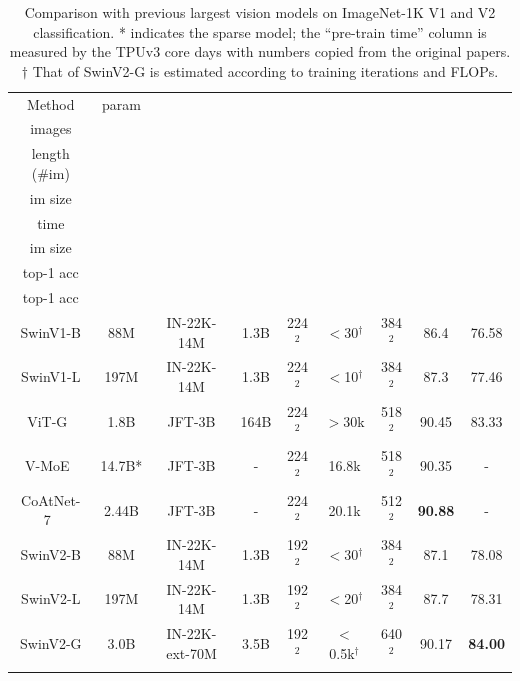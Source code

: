 \documentclass[10pt,twocolumn,letterpaper]{article}
\begin{document}
\begin{table}[t]
    \centering
    \small
    \addtolength{\tabcolsep}{-2.0pt}
    \begin{tabular}{ccccccccc}
    \Xhline{1.0pt}
    Method & param & \makecell{ pre-train\\images} & \makecell{ pre-train\\length (\#im)} & \makecell{pre-train\\im size} & \makecell{pre-train\\time} & \makecell{fine-tune\\im size} & \makecell{ImageNet-1K-V1\\top-1 acc} & \makecell{ImaegNet-1K-V2\\top-1 acc}\\
    \hline
    SwinV1-B & 88M & IN-22K-14M & 1.3B & 224$^2$ & $<$30$^\dag$ & 384$^2$ &86.4 &  76.58\\
    SwinV1-L & 197M & IN-22K-14M & 1.3B & 224$^2$ & $<$10$^\dag$ & 384$^2$ &  87.3 & 77.46\\
    \hline
    ViT-G~\cite{zhai2021scaling} & 1.8B & JFT-3B & 164B & 224$^2$ & $>$30k & 518$^2$ & 90.45 & 83.33 \\
    V-MoE~\cite{riquelme2021scaling} & 14.7B* & JFT-3B & - & 224$^2$ & 16.8k & 518$^2$ & 90.35 & - \\
    CoAtNet-7~\cite{dai2021coatnet} & 2.44B & JFT-3B & - & 224$^2$ & 20.1k & 512$^2$ & \textbf{90.88} & - \\
    \hline
    SwinV2-B & 88M & IN-22K-14M & 1.3B & 192$^2$ & $<$30$^\dag$ & 384$^2$ & 87.1 & 78.08\\
    SwinV2-L & 197M & IN-22K-14M & 1.3B & 192$^2$ & $<$20$^\dag$ & 384$^2$ & 87.7 & 78.31\\
    { SwinV2-G} & 3.0B & IN-22K-ext-70M & 3.5B & 192$^2$ & $<$0.5k$^\dag$ & 640$^2$  & 90.17 & \textbf{84.00} \\
    \Xhline{1.0pt}
    \end{tabular}
    \caption{Comparison with previous largest vision models on ImageNet-1K V1 and V2 classification. * indicates the sparse model; the ``pre-train time'' column is measured by the TPUv3 core days with numbers copied from the original papers. $\dag$ That of SwinV2-G is estimated according to training iterations and FLOPs.}
    \label{tab:sota_imagenet}
    \vspace{-1em}
\end{table}
\end{document}
